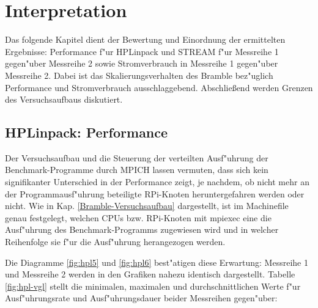 \chapter{Interpretation}\label{Kap4}

Das folgende Kapitel dient der Bewertung und Einordnung der ermittelten Ergebnisse: Performance f"ur HPLinpack und STREAM f"ur Messreihe 1 gegen"uber Messreihe 2 sowie Stromverbrauch in Messreihe 1 gegen"uber Messreihe 2. Dabei ist das Skalierungsverhalten des Bramble bez"uglich Performance und Stromverbrauch ausschlaggebend. Abschlie\ss end werden Grenzen des Versuchsaufbaus diskutiert.   

\section{HPLinpack: Performance}\label{Interpretation-Linpack}


Der Versuchsaufbau und die Steuerung der verteilten Ausf"uhrung der Benchmark-Programme durch MPICH lassen vermuten, dass sich kein signifikanter Unterschied in der Performance zeigt, je nachdem, ob nicht mehr an der Programmausf"uhrung beteiligte RPi-Knoten heruntergefahren werden oder nicht. Wie in Kap. \ref{Bramble-Versuchsaufbau} dargestellt, ist im Machinefile genau festgelegt, welchen CPUs bzw. RPi-Knoten mit mpiexec eine die Ausf"uhrung des Benchmark-Programms zugewiesen wird und in welcher Reihenfolge sie f"ur die Ausf"uhrung herangezogen werden.

Die Diagramme \ref{fig:hpl5} und \ref{fig:hpl6} best"atigen diese Erwartung: Messreihe 1 und Messreihe 2 werden in den Grafiken nahezu identisch dargestellt. Tabelle \ref{fig:hpl-vgl} stellt die minimalen, maximalen und durchschnittlichen Werte f"ur Ausf"uhrungsrate und Ausf"uhrungsdauer beider Messreihen gegen"uber: 
\noindent

